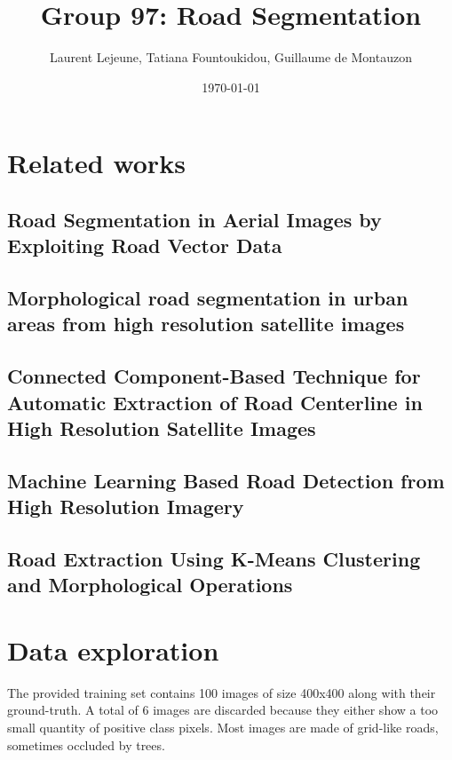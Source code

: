 \documentclass[10pt,conference,compsocconf]{IEEEtran}
\author{Laurent Lejeune, Tatiana Fountoukidou, Guillaume de Montauzon}
\date{\today}
\title{Group 97: Road Segmentation}
\begin{document}
\maketitle

\section{Related works}
\label{sec:orgheadline6}
\subsection{Road Segmentation in Aerial Images by Exploiting Road Vector Data \cite{6602035}}
\label{sec:orgheadline1}
\subsection{Morphological road segmentation in urban areas from high resolution satellite images \cite{gaetano:inria-00618222}}
\label{sec:orgheadline2}
\subsection{Connected Component-Based Technique for Automatic Extraction of Road Centerline in High Resolution Satellite Images \cite{sujatha15_connec_compon_based_techn_autom}}
\label{sec:orgheadline3}
\subsection{Machine Learning Based Road Detection from High Resolution Imagery}
\label{sec:orgheadline4}
\subsection{Road Extraction Using K-Means Clustering and Morphological Operations \cite{maurya2011road}}
\label{sec:orgheadline5}



\printbibliography
\section{Data exploration}
\label{sec:orgheadline7}
The provided training set contains 100 images of size 400x400 along with their ground-truth. A total of 6 images are discarded because they either show a too small quantity of positive class pixels. 
Most images are made of grid-like roads, sometimes occluded by trees. 
\end{document}
